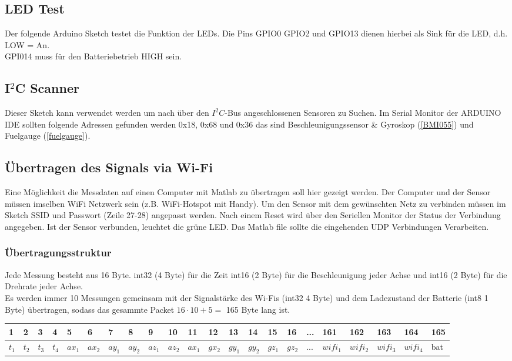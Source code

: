 \documentclass[10pt, a4paper, onecolumn]{article} %
\begin{document}
\subsection{LED Test}
Der folgende Arduino Sketch testet die Funktion der LEDs.
Die Pins GPIO0 GPIO2 und GPIO13 dienen hierbei als Sink für die LED, d.h. LOW = An.\\
GPI014 muss für den Batteriebetrieb HIGH sein.



\subsection{I$^2$C Scanner}

Dieser Sketch kann verwendet werden um nach über den $I^2C$-Bus angeschlossenen Sensoren zu Suchen. Im Serial Monitor der ARDUINO IDE  sollten folgende Adressen gefunden werden 0x18, 0x68 und 0x36 das sind Beschleunigungssensor \& Gyroskop (\ref{BMI055}) und Fuelgauge (\ref{fuelgauge}).




\subsection{Übertragen des Signals via Wi-Fi}
Eine Möglichkeit die Messdaten auf einen Computer mit Matlab zu übertragen soll hier gezeigt werden.
Der Computer und der Sensor müssen imselben WiFi Netzwerk sein (z.B. WiFi-Hotspot mit Handy). Um den Sensor mit dem gewünschten Netz zu verbinden müssen im Sketch SSID und Passwort (Zeile 27-28) angepasst werden. Nach einem Reset wird über den Seriellen Monitor der Status der Verbindung angegeben. Ist der Sensor verbunden, leuchtet die grüne LED.
Das Matlab file sollte die eingehenden UDP Verbindungen Verarbeiten. 

\subsubsection{Übertragungsstruktur}
Jede Messung besteht aus 16 Byte. int32 (4 Byte) für die Zeit int16 (2  Byte) für die Beschleunigung jeder Achse und  int16 (2 Byte) für die Drehrate jeder Achse.   \\
Es werden immer 10 Messungen gemeinsam mit der Signalstärke des Wi-Fis (int32 4 Byte) und dem Ladezustand der Batterie (int8 1 Byte) übertragen, sodass das gesammte Packet $16 \cdot 10 + 5 = $ 165 Byte lang ist.\\
{\tiny 
\begin{tabular}{llllllllllllllllllllll} \toprule
	{1} & {2} & {3} & {4} & {5} & {6} & {7} & {8} & {9} & {10} & {11} & {12} & {13} & {14} & {15} & {16}& {...} &{161}& {162} & {163} & {164} & {165} \\ \midrule
	{$t_1$} & {$t_2$} & {$t_3$} & {$t_4$} & {$ax_1$} & {$ax_2$} & {$ay_1$} & {$ay_2$} & {$az_1$} & {$az_2$} &  {$ax_1$} & {$gx_2$} & {$gy_1$} & {$gy_2$} & {$gz_1$} & {$gz_2$}& {...} & {$wifi_1$} & {$wifi_2$} & {$wifi_3$} & {$wifi_4$} & {bat}\\  \bottomrule
\end{tabular}}
 {\normalsize }\\
 
\end{document}
